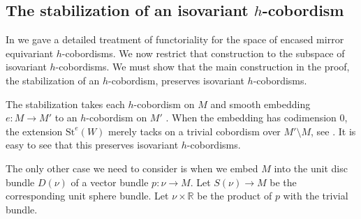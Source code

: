 \documentclass[11pt]{amsart}
\theoremstyle{definition}
\newtheorem{notn}{Notation}[section]
\numberwithin{equation}{section}
\numberwithin{figure}{section}
\newcommand{\R}{\mathbb R}
\newcommand{\St}{\mathrm{St}}
\begin{document}
\subsection{The stabilization of an  isovariant $h$-cobordism}\label{isovhcobstab}
In \cite{GIMM1} we gave a detailed treatment of functoriality for the space of encased mirror equivariant $h$-cobordisms. We now restrict that construction to the subspace of isovariant $h$-cobordisms. We must show that the main construction in the proof, the stabilization of an $h$-cobordism, preserves isovariant $h$-cobordisms.


The stabilization takes each $h$-cobordism on $M$ and smooth embedding $e\colon M\to M'$ to an $h$-cobordism on $M'$ . When the embedding has codimension 0, the extension $\St^e(W)$ merely tacks on a trivial cobordism over $M' \setminus M$, see \cite[Definition 4.13]{GIMM1}. It is easy to see that this preserves isovariant $h$-cobordisms.

The only other case we need to consider is when we embed $M$ into the unit disc bundle $D(\nu)$ of a vector bundle $p\colon \nu \to M$. Let $S(\nu)\to M$ be the corresponding unit sphere bundle.
Let $\nu \times \R$ be the product of $p$ with the trivial bundle.
\end{document}
